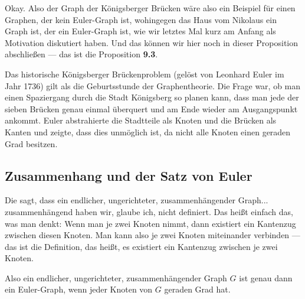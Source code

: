 \begin{spoken-clean}[00:05:40 - 00:06:45]
Okay. Also der Graph der Königsberger Brücken wäre also ein Beispiel für einen Graphen, der kein Euler-Graph ist, wohingegen das Haus vom Nikolaus ein Graph ist, der ein Euler-Graph ist, wie wir letztes Mal kurz am Anfang als Motivation diskutiert haben. Und das können wir hier noch in dieser Proposition abschließen --- das ist die Proposition \textbf{9.3}.
\end{spoken-clean}

\begin{didactic-insight}
Das historische Königsberger Brückenproblem (gelöst von Leonhard Euler im Jahr 1736) gilt als die Geburtsstunde der Graphentheorie. Die Frage war, ob man einen Spaziergang durch die Stadt Königsberg so planen kann, dass man jede der sieben Brücken genau einmal überquert und am Ende wieder am Ausgangspunkt ankommt. Euler abstrahierte die Stadtteile als Knoten und die Brücken als Kanten und zeigte, dass dies unmöglich ist, da nicht alle Knoten einen geraden Grad besitzen.
\end{didactic-insight}

\subsection{Zusammenhang und der Satz von Euler}

\begin{spoken-clean}[00:06:45 - 00:08:55]
Die sagt, dass ein endlicher, ungerichteter, zusammenhängender Graph... zusammenhängend haben wir, glaube ich, nicht definiert. Das heißt einfach das, was man denkt: Wenn man je zwei Knoten nimmt, dann existiert ein Kantenzug zwischen diesen Knoten. Man kann also je zwei Knoten miteinander verbinden --- das ist die Definition, das heißt, es existiert ein Kantenzug zwischen je zwei Knoten. 

Also ein endlicher, ungerichteter, zusammenhängender Graph $G$ ist genau dann ein Euler-Graph, wenn jeder Knoten von $G$ geraden Grad hat. 
\end{spoken-clean}

\begin{math-stroke}

\end{math-stroke}

